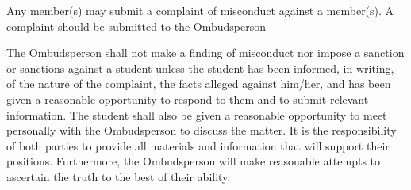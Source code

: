 \begin{longenum}[ label*=\arabic*., align=left]
     \begin{longenum}[ label*=\arabic*., align=left]

           \item Any  member(s)  may  submit  a  complaint  of  misconduct  against  a  member(s).  A  complaint 
should be submitted to the Ombudsperson
           \item The Ombudsperson shall not make a finding of misconduct nor impose a sanction or sanctions  against  a  student  unless  the  student  has  been  informed,  in  writing,  of  the nature  of  the  complaint,  the  facts  alleged  against  him/her,  and  has  been  given  a reasonable  opportunity  to  respond  to  them  and  to  submit  relevant  information.  The student  shall also  be  given  a  reasonable  opportunity  to  meet  personally  with  the Ombudsperson to discuss the matter. It is the responsibility of both parties to provide all materials    and    information    that    will    support    their    positions.  Furthermore,    the Ombudsperson  will make  reasonable  attempts  to  ascertain  the  truth  to  the  best  of  their ability. 
           

\end{longenum}
\end{longenum}
